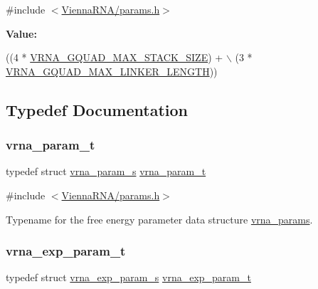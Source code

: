 {\ttfamily \#include $<$\mbox{\hyperlink{params_8h}{Vienna\+R\+N\+A/params.\+h}}$>$}

{\bfseries Value\+:}
\begin{DoxyCode}
((4 * \mbox{\hyperlink{group__energy__parameters_gab7b5159125a90babbd3b81319305f35f}{VRNA\_GQUAD\_MAX\_STACK\_SIZE}}) + \(\backslash\)
                                         (3 * \mbox{\hyperlink{group__energy__parameters_gaabc251a60f6dbe927dd3a3881a161fb7}{VRNA\_GQUAD\_MAX\_LINKER\_LENGTH}}))
\end{DoxyCode}


\subsection{Typedef Documentation}
\mbox{\label{group__energy__parameters_ga8a69ca7d787e4fd6079914f5343a1f35}} 
\subsubsection{\texorpdfstring{vrna\+\_\+param\+\_\+t}{vrna\_param\_t}}
{\footnotesize\ttfamily typedef struct \mbox{\hyperlink{group__energy__parameters_structvrna__param__s}{vrna\+\_\+param\+\_\+s}} \mbox{\hyperlink{group__energy__parameters_ga8a69ca7d787e4fd6079914f5343a1f35}{vrna\+\_\+param\+\_\+t}}}



{\ttfamily \#include $<$\mbox{\hyperlink{params_8h}{Vienna\+R\+N\+A/params.\+h}}$>$}



Typename for the free energy parameter data structure \mbox{\hyperlink{group__energy__parameters_gad0e3e7e74bdc50d1709d40c92993185e}{vrna\+\_\+params}}. 

\mbox{\label{group__energy__parameters_ga01d8b92fe734df8d79a6169482c7d8d8}} 
\subsubsection{\texorpdfstring{vrna\+\_\+exp\+\_\+param\+\_\+t}{vrna\_exp\_param\_t}}
{\footnotesize\ttfamily typedef struct \mbox{\hyperlink{group__energy__parameters_structvrna__exp__param__s}{vrna\+\_\+exp\+\_\+param\+\_\+s}} \mbox{\hyperlink{group__energy__parameters_ga01d8b92fe734df8d79a6169482c7d8d8}{vrna\+\_\+exp\+\_\+param\+\_\+t}}}



